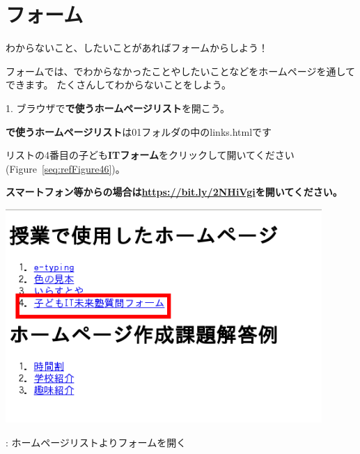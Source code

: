 \documentclass[a4paper,12pt]{jarticle}
\begin{document}
\section{フォーム}
わからないこと、したいことがあればフォームからしよう！

フォームでは、でわからなかったことやしたいことなどをホームページを通してできます。
たくさんしてわからないことをしよう。

1.
ブラウザで\textbf{で使うホームページリスト}を開こう。

\textbf{で使うホームページリスト}は01フォルダの中のlinks.htmlです

リストの4番目の子ども\textbf{ITフォーム}をクリックして開いてください(Figure~\ref{seq:refFigure46})。


\bigskip

{\bfseries
  スマートフォン等からの場合は\url{https://bit.ly/2NHiVgi}を開いてください。}



\centering
\begin{minipage}{\textwidth}
  {\upshape
    \includegraphics[width=0.9\textwidth]{textbook-img245.png}
    \flushleft

    \bigskip
    {\theFigure\label{seq:refFigure46}}:
    ホームページリストよりフォームを開く}
\end{minipage}

\bigskip

\bigskip
\end{document}
